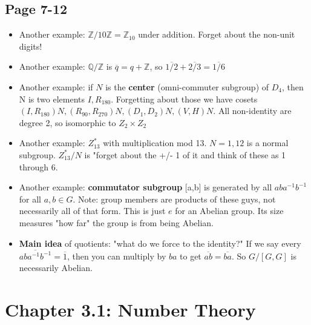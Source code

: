 \documentclass[11pt, oneside]{article}   	%
\begin{document}
\subsection{Page 7-12}
\begin{itemize}
\item Another example: $\mathbb{Z} / 10\mathbb{Z} = \mathbb{Z}_{10}$ under addition.  Forget about the non-unit digits!
\item Another example: $\mathbb{Q} / \mathbb{Z}$ is $\overline{q} = q + \mathbb{Z}$, so $\overline{1/2} + \overline{2/3} = \overline{1/6}$
\item Another example: if $N$ is the \textbf{center} (omni-commuter subgroup) of $D_4$, then N is two elements $I, R_{180}$.  Forgetting about those we have cosets $(I, R_{180})N, (R_{90}, R_{270})N, (D_1, D_2)N, (V,H)N$.  All non-identity are degree 2, so isomorphic to $Z_2 \times Z_2$
\item Another example: $Z_{13}^*$ with multiplication mod 13.  $N = {1,12}$ is a normal subgroup.  $Z_{13}^* / N$ is "forget about the +/- 1 of it and think of these as 1 through 6.  
\item Another example: \textbf{commutator subgroup} [a,b] is generated by all $aba^{-1}b^{-1}$ for all $a, b \in G$.  Note: group members are products of these guys, not necessarily all of that form.  This is just $e$ for an Abelian group.  Its size measures "how far" the group is from being Abelian.  
\item \textbf{Main idea} of quotients: "what do we force to the identity?"  If we say every $\overline{aba^{-1}b^{-1}} = \overline{1}$, then you can multiply by $ba$ to get $\overline{ab} =  \overline{ba}$.  So $G / [G,G]$ is necessarily Abelian.
 \end{itemize}


\section{Chapter 3.1: Number Theory}
\end{document}
